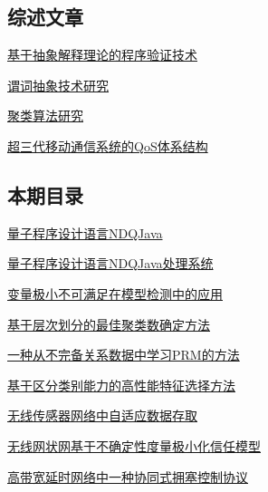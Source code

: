 \documentclass[a4paper]{article}
\begin{document}
\subsection{综述文章}
\href{http://www.jos.org.cn/ch/reader/download_pdf.aspx?file_no=20080103&year_id=2008&quarter_id=1&falg=1}{基于抽象解释理论的程序验证技术}

\href{http://www.jos.org.cn/ch/reader/download_pdf.aspx?file_no=20080104&year_id=2008&quarter_id=1&falg=1}{谓词抽象技术研究}

\href{http://www.jos.org.cn/ch/reader/download_pdf.aspx?file_no=20080106&year_id=2008&quarter_id=1&falg=1}{聚类算法研究}

\href{http://www.jos.org.cn/ch/reader/download_pdf.aspx?file_no=20080110&year_id=2008&quarter_id=1&falg=1}{超三代移动通信系统的QoS体系结构}

\subsection{本期目录}
\href{http://www.jos.org.cn/ch/reader/download_pdf.aspx?file_no=20080101&year_id=2008&quarter_id=1&falg=1}{量子程序设计语言NDQJava}

\href{http://www.jos.org.cn/ch/reader/download_pdf.aspx?file_no=20080102&year_id=2008&quarter_id=1&falg=1}{量子程序设计语言NDQJava处理系统}

\href{http://www.jos.org.cn/ch/reader/download_pdf.aspx?file_no=20080105&year_id=2008&quarter_id=1&falg=1}{变量极小不可满足在模型检测中的应用}

\href{http://www.jos.org.cn/ch/reader/download_pdf.aspx?file_no=20080107&year_id=2008&quarter_id=1&falg=1}{基于层次划分的最佳聚类数确定方法}

\href{http://www.jos.org.cn/ch/reader/download_pdf.aspx?file_no=20080108&year_id=2008&quarter_id=1&falg=1}{一种从不完备关系数据中学习PRM的方法}

\href{http://www.jos.org.cn/ch/reader/download_pdf.aspx?file_no=20080109&year_id=2008&quarter_id=1&falg=1}{基于区分类别能力的高性能特征选择方法}

\href{http://www.jos.org.cn/ch/reader/download_pdf.aspx?file_no=20080111&year_id=2008&quarter_id=1&falg=1}{无线传感器网络中自适应数据存取}

\href{http://www.jos.org.cn/ch/reader/download_pdf.aspx?file_no=20080112&year_id=2008&quarter_id=1&falg=1}{无线网状网基于不确定性度量极小化信任模型}

\href{http://www.jos.org.cn/ch/reader/download_pdf.aspx?file_no=20080113&year_id=2008&quarter_id=1&falg=1}{高带宽延时网络中一种协同式拥塞控制协议}
\end{document}
